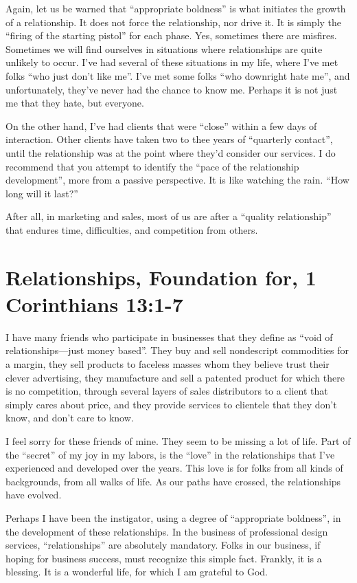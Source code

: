 \documentclass[12pt]{memoir}
\begin{document}
Again, let us be warned that ``appropriate boldness'' is what initiates
the growth of a relationship. It does not force the relationship,
nor drive it. It is simply the ``firing of the starting pistol''
for each phase. Yes, sometimes there are misfires. Sometimes we will
find ourselves in situations where relationships are quite unlikely
to occur. I've had several of these situations in my life, where I've
met folks ``who just don't like me''. I've met some folks ``who
downright hate me'', and unfortunately, they've never had the chance
to know me. Perhaps it is not just me that they hate, but everyone.

On the other hand, I've had clients that were ``close'' within a
few days of interaction. Other clients have taken two to thee years
of ``quarterly contact'', until the relationship was at the point
where they'd consider our services. I do recommend that you attempt
to identify the ``pace of the relationship development'', more from
a passive perspective. It is like watching the rain. ``How long will
it last?''

After all, in marketing and sales, most of us are after a ``quality
relationship'' that endures time, difficulties, and competition from
others. 

\section{Relationships, Foundation for, 1 Corinthians 13:1-7  }

I have many friends who participate in businesses that they define
as ``void of relation\-ships---just money based''. They buy and sell
nondescript commodities for a margin, they sell products to faceless
masses whom they believe trust their clever advertising, they manufacture
and sell a patented product for which there is no competition, through
several layers of sales distributors to a client that simply cares
about price, and they provide services to clientele that they don't
know, and don't care to know. 

I feel sorry for these friends of mine. They seem to be missing a
lot of life. Part of the ``secret'' of my joy in my labors, is the
``love'' in the relationships that I've experienced and developed
over the years. This love is for folks from all kinds of backgrounds,
from all walks of life. As our paths have crossed, the relationships
have evolved.

Perhaps I have been the instigator, using a degree of ``appropriate
boldness'', in the development of these relationships. In the business
of professional design services, ``relationships'' are absolutely
mandatory. Folks in our business, if hoping for business success,
must recognize this simple fact. Frankly, it is a blessing. It is
a wonderful life, for which I am grateful to God.
\end{document}
